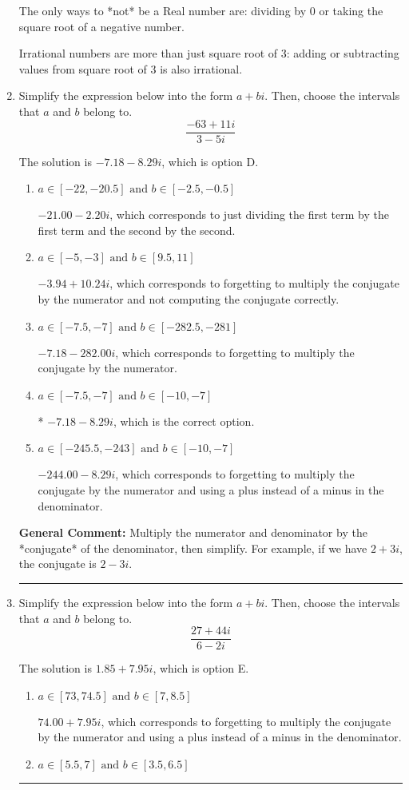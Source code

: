 \documentclass{extbook}[14pt]
\newcommand{\litem}[1]{\item #1

\rule{\textwidth}{0.4pt}}
\begin{document}
\begin{enumerate}
{ The only ways to *not* be a Real number are: dividing by 0 or taking the square root of a negative number. 
 
 Irrational numbers are more than just square root of 3: adding or subtracting values from square root of 3 is also irrational.
}
\litem{
Simplify the expression below into the form $a+bi$. Then, choose the intervals that $a$ and $b$ belong to.
\[ \frac{-63 + 11 i}{3 - 5 i} \]

The solution is \( -7.18  - 8.29 i \), which is option D.\begin{enumerate}[label=\Alph*.]
\item \( a \in [-22, -20.5] \text{ and } b \in [-2.5, -0.5] \)

 $-21.00  - 2.20 i$, which corresponds to just dividing the first term by the first term and the second by the second.
\item \( a \in [-5, -3] \text{ and } b \in [9.5, 11] \)

 $-3.94  + 10.24 i$, which corresponds to forgetting to multiply the conjugate by the numerator and not computing the conjugate correctly.
\item \( a \in [-7.5, -7] \text{ and } b \in [-282.5, -281] \)

 $-7.18  - 282.00 i$, which corresponds to forgetting to multiply the conjugate by the numerator.
\item \( a \in [-7.5, -7] \text{ and } b \in [-10, -7] \)

* $-7.18  - 8.29 i$, which is the correct option.
\item \( a \in [-245.5, -243] \text{ and } b \in [-10, -7] \)

 $-244.00  - 8.29 i$, which corresponds to forgetting to multiply the conjugate by the numerator and using a plus instead of a minus in the denominator.
\end{enumerate}

\textbf{General Comment:} Multiply the numerator and denominator by the *conjugate* of the denominator, then simplify. For example, if we have $2+3i$, the conjugate is $2-3i$.
}
\litem{
Simplify the expression below into the form $a+bi$. Then, choose the intervals that $a$ and $b$ belong to.
\[ \frac{27 + 44 i}{6 - 2 i} \]

The solution is \( 1.85  + 7.95 i \), which is option E.\begin{enumerate}[label=\Alph*.]
\item \( a \in [73, 74.5] \text{ and } b \in [7, 8.5] \)

 $74.00  + 7.95 i$, which corresponds to forgetting to multiply the conjugate by the numerator and using a plus instead of a minus in the denominator.
\item \( a \in [5.5, 7] \text{ and } b \in [3.5, 6.5] \)


\end{enumerate}}
\end{enumerate}
\end{document}
